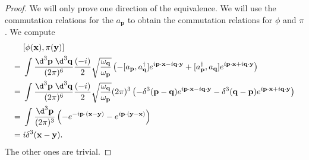 \documentclass[a4paper]{article}
\begin{document}
\begin{proof}
  We will only prove one direction of the equivalence. We will use the commutation relations for the $a_\mathbf{p}$ to obtain the commutation relations for $\phi$ and $\pi$. We compute
  \begin{align*}
    &[\phi(\mathbf{x}), \pi(\mathbf{y})]\\
    ={}& \int \frac{\d^3 \mathbf{p}\; \d^3 \mathbf{q}}{(2\pi)^6} \frac{(-i)}{2}\sqrt{\frac{\omega_\mathbf{q}}{\omega_\mathbf{p}}}\left(-[a_\mathbf{p}, a_\mathbf{q}^\dagger] e^{i\mathbf{p} \cdot \mathbf{x} - i \mathbf{q}\cdot \mathbf{y}} + [a_\mathbf{p}^\dagger, a_\mathbf{q}] e^{i\mathbf{p}\cdot \mathbf{x} + i \mathbf{q}\cdot \mathbf{y}}\right)\\
    ={}& \int \frac{\d^3 \mathbf{p}\; \d^3 \mathbf{q}}{(2\pi)^6} \frac{(-i)}{2}\sqrt{\frac{\omega_\mathbf{q}}{\omega_\mathbf{p}}}(2\pi)^3\left(-\delta^3(\mathbf{p} - \mathbf{q}) e^{i\mathbf{p} \cdot \mathbf{x} - i \mathbf{q}\cdot \mathbf{y}} - \delta^3(\mathbf{q} - \mathbf{p}) e^{i\mathbf{p}\cdot \mathbf{x} + i \mathbf{q}\cdot \mathbf{y}}\right)\\
    ={}& \int \frac{\d^3 \mathbf{p}}{(2\pi)^3} \left(-e^{-i\mathbf{p}\cdot (\mathbf{x} - \mathbf{y})} - e^{i\mathbf{p} \cdot(\mathbf{y} - \mathbf{x})}\right)\\
    ={}& i \delta^3(\mathbf{x} - \mathbf{y}).
  \end{align*}
  The other ones are trivial.
\end{proof}
\end{document}
